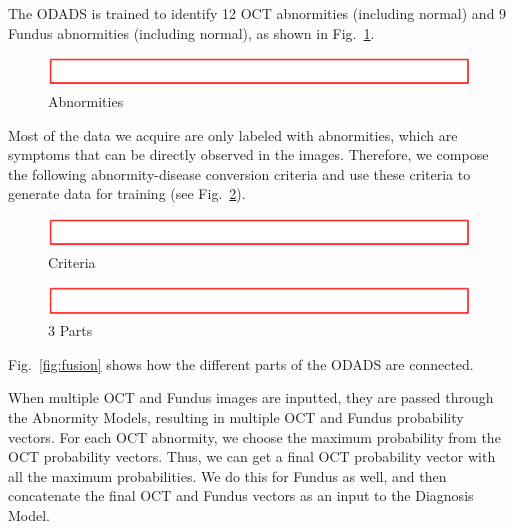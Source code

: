 \documentclass{article}
\begin{document}
		The ODADS is trained to identify 12 OCT abnormities (including normal) and 9 Fundus abnormities (including normal), as shown in Fig.~\ref{fig:abnormities}.
		
		\begin{figure}[htbp]
			\centering
			\includegraphics[width=\linewidth]{Figs/Temp.png}
			\caption{Abnormities}
			\vspace{0.3cm}
			\label{fig:abnormities}
		\end{figure}
		
		Most of the data we acquire are only labeled with abnormities, which are symptoms that can be directly observed in the images. Therefore, we compose the following abnormity-disease conversion criteria and use these criteria to generate data for training (see Fig.~\ref{fig:criteria}). 
		
		\begin{figure}[htbp]
			\centering
			\includegraphics[width=\linewidth]{Figs/Temp.png}
			\caption{Criteria}
			\vspace{0.3cm}
			\label{fig:criteria}
		\end{figure}
		
		\begin{figure}[htbp]
			\centering
			\includegraphics[width=\linewidth]{Figs/Temp.png}
			\caption{3 Parts}
			\vspace{0.3cm}
			\label{fig:3_parts}
		\end{figure}
		
		Fig.~\ref{fig:fusion} shows how the different parts of the ODADS are connected.
		
		When multiple OCT and Fundus images are inputted, they are passed through the Abnormity Models, resulting in multiple OCT and Fundus probability vectors. For each OCT abnormity, we choose the maximum probability  from the OCT probability vectors. Thus, we can get a final OCT probability vector with all the maximum probabilities. We do this for Fundus as well, and then concatenate the final OCT and Fundus vectors as an input to the Diagnosis Model.
		
\end{document}
